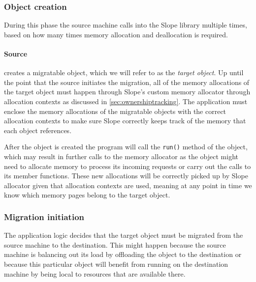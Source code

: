 \subsubsection{Object creation}
During this phase the source machine calls into the Slope library multiple
times, based on how many times memory allocation and deallocation is required.

\paragraph{Source}
creates a migratable object, which we will refer to as the \emph{target object}.
Up until the point that
the source initiates the migration, all of the memory allocations of the target object
must happen through
Slope's custom memory allocator through allocation contexts as discussed in
\autoref{sec:ownershiptracking}.
The application must enclose the memory allocations of the migratable objects
with the correct allocation contexts to make sure Slope correctly keeps track of the
memory that each object references.



After the object is created the program will call the \texttt{run()} method
of the object, which may result in further calls to the memory allocator as
the object might need to allocate memory to process its incoming requests or
carry out the calls to its member functions. These new allocations will be
correctly picked up by Slope allocator given that allocation contexts are used,
meaning at any point in time we know which memory pages belong to the target object.

\subsubsection{Migration initiation}
The application logic decides that the target object must be migrated from the
source machine to the destination. This might happen because the source machine
is balancing out its load by offloading the object to the destination or because
this particular object will benefit from running on the destination machine
by being local to resources that are available there.


